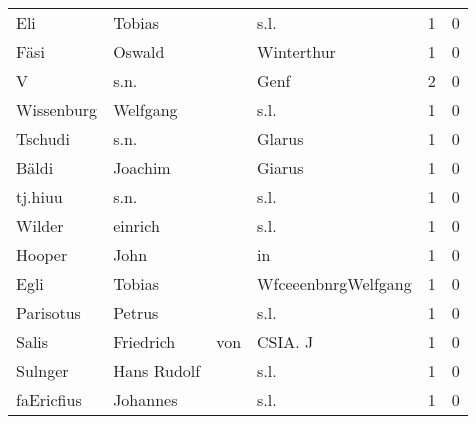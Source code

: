 \begin{center}
\begin{tiny}
\begin{longtabu}{llllrr}
                      Eli &                             Tobias &             &                                        s.l. &          1 &         0 \\
                     Fäsi &                             Oswald &             &                                  Winterthur &          1 &         0 \\
                        V &                               s.n. &             &                                        Genf &          2 &         0 \\
               Wissenburg &                           Welfgang &             &                                        s.l. &          1 &         0 \\
                  Tschudi &                               s.n. &             &                                      Glarus &          1 &         0 \\
                    Bäldi &                            Joachim &             &                                      Giarus &          1 &         0 \\
                  tj.hiuu &                               s.n. &             &                                        s.l. &          1 &         0 \\
                   Wilder &                            einrich &             &                                        s.l. &          1 &         0 \\
                   Hooper &                               John &             &                                          in &          1 &         0 \\
                     Egli &                             Tobias &             &                         WfceeenbnrgWelfgang &          1 &         0 \\
                Parisotus &                             Petrus &             &                                        s.l. &          1 &         0 \\
                    Salis &                          Friedrich &         von &                                     CSIA. J &          1 &         0 \\
                  Sulnger &                        Hans Rudolf &             &                                        s.l. &          1 &         0 \\
               faEricfius &                           Johannes &             &                                        s.l. &          1 &         0 \\

\end{longtabu}
\end{tiny}
\end{center}
